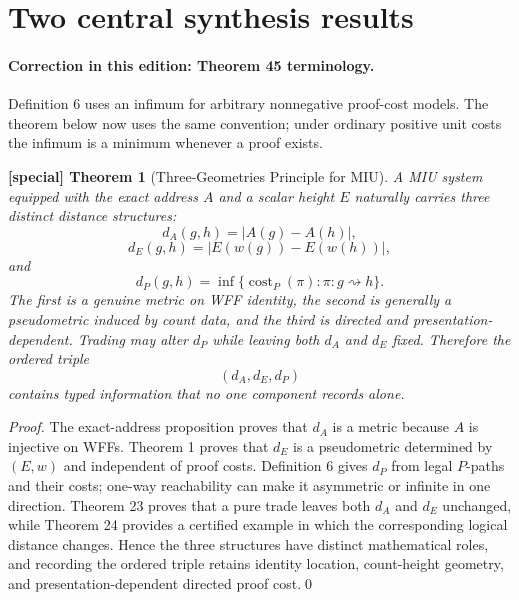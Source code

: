 \documentclass[11pt]{article}
\newtheorem{spthm}{[special] Theorem}
\newcommand{\dA}{d_A}
\newcommand{\dE}{d_E}
\begin{document}
\section{Two central synthesis results}
\paragraph{Correction in this edition: Theorem 45 terminology.}
Definition 6 uses an infimum for arbitrary nonnegative proof-cost models. The theorem below now uses the same convention; under ordinary positive unit costs the infimum is a minimum whenever a proof exists.

\begin{spthm}[Three-Geometries Principle for MIU]
A MIU system equipped with the exact address $A$ and a scalar height $E$ naturally carries three distinct distance structures:
\[
\dA(g,h)=|A(g)-A(h)|,
\]
\[
\dE(g,h)=|E(w(g))-E(w(h))|,
\]
and
\[
d_P(g,h)=\inf\{\operatorname{cost}_P(\pi):\pi:g\rightsquigarrow h\}.
\]
The first is a genuine metric on WFF identity, the second is generally a pseudometric induced by count data, and the third is directed and presentation-dependent. Trading may alter $d_P$ while leaving both $d_A$ and $d_E$ fixed. Therefore the ordered triple
\[(\dA,\dE,d_P)\]
contains typed information that no one component records alone.
\end{spthm}
\textit{Proof.} The exact-address proposition proves that $d_A$ is a metric because $A$ is injective on WFFs. Theorem 1 proves that $d_E$ is a pseudometric determined by $(E,w)$ and independent of proof costs. Definition 6 gives $d_P$ from legal $P$-paths and their costs; one-way reachability can make it asymmetric or infinite in one direction. Theorem 23 proves that a pure trade leaves both $d_A$ and $d_E$ unchanged, while Theorem 24 provides a certified example in which the corresponding logical distance changes. Hence the three structures have distinct mathematical roles, and recording the ordered triple retains identity location, count-height geometry, and presentation-dependent directed proof cost.\qed
\end{document}
